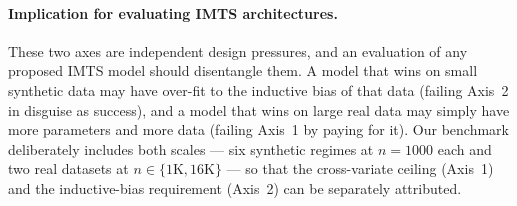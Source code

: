 \paragraph{Implication for evaluating IMTS architectures.}
These two axes are independent design pressures, and an evaluation of any
proposed IMTS model should disentangle them. A model that wins on small
synthetic data may have over-fit to the inductive bias of that data
(failing Axis~2 in disguise as success), and a model that wins on large
real data may simply have more parameters and more data
(failing Axis~1 by paying for it). Our benchmark deliberately includes
both scales --- six synthetic regimes at $n{=}1000$ each and two real
datasets at $n{\in}\{1\text{K},16\text{K}\}$ --- so that the cross-variate
ceiling (Axis~1) and the inductive-bias requirement (Axis~2) can be
separately attributed.
